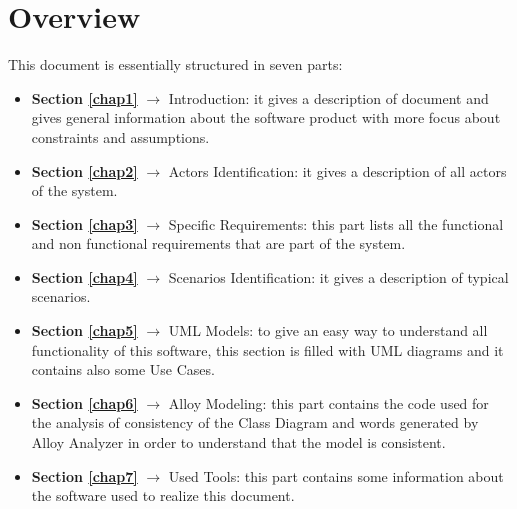 \section{Overview}
This document is essentially structured in seven parts:
\begin{itemize}
	\item \textbf{Section \ref{chap1}} $\rightarrow$ Introduction: it gives a description of document and gives general information about the software product with more focus about constraints and assumptions.
	\item \textbf{Section \ref{chap2}} $\rightarrow$ Actors Identification: it gives a description of all actors of the system.
	\item \textbf{Section \ref{chap3}} $\rightarrow$ Specific Requirements: this part lists all the functional and non functional requirements that are part of the system.
	\item \textbf{Section \ref{chap4}} $\rightarrow$ Scenarios Identification: it gives a description of typical scenarios.
	\item \textbf{Section \ref{chap5}} $\rightarrow$ UML Models: to give an easy way to understand all functionality of this software, this section is filled with UML diagrams and it contains also some Use Cases.
	\item \textbf{Section \ref{chap6}} $\rightarrow$ Alloy Modeling: this part contains the code used for the analysis of consistency of the Class Diagram and words generated by Alloy Analyzer in order to understand that the model is consistent.
	\item \textbf{Section \ref{chap7}} $\rightarrow$ Used Tools: this part contains some information about the software used to realize this document.
\end{itemize}